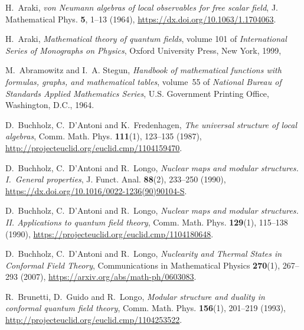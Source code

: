 \documentclass[a4paper,12pt]{article}
\theoremstyle{plain}
\theoremstyle{definition}
\theoremstyle{remark}
\begin{document}
{\small
\begin{thebibliography}{{Haa}96}

H.~Araki, \textsl{ von {N}eumann algebras of local observables for free scalar
  field},
\newblock J. Mathematical Phys. \textbf{ 5}, 1--13 (1964),
\newblock \url{https://dx.doi.org/10.1063/1.1704063}.

H.~Araki,
\newblock \textsl{ Mathematical theory of quantum fields}, volume 101 of
  \textsl{ International Series of Monographs on Physics},
\newblock Oxford University Press, New York, 1999,

M.~Abramowitz and I.~A. Stegun,
\newblock \textsl{ Handbook of mathematical functions with formulas, graphs,
  and mathematical tables}, volume~55 of \textsl{ National Bureau of Standards
  Applied Mathematics Series},
\newblock U.S. Government Printing Office, Washington, D.C., 1964.

D.~Buchholz, C.~D'Antoni and K.~Fredenhagen, \textsl{ The universal structure
  of local algebras},
\newblock Comm. Math. Phys. \textbf{ 111}(1), 123--135 (1987),
\newblock \url{http://projecteuclid.org/euclid.cmp/1104159470}.

D.~Buchholz, C.~D'Antoni and R.~Longo, \textsl{ Nuclear maps and modular
  structures. {I}.\ {G}eneral properties},
\newblock J. Funct. Anal. \textbf{ 88}(2), 233--250 (1990),
\newblock \url{https://dx.doi.org/10.1016/0022-1236(90)90104-S}.

D.~Buchholz, C.~D'Antoni and R.~Longo, \textsl{ Nuclear maps and modular
  structures. {II}. {A}pplications to quantum field theory},
\newblock Comm. Math. Phys. \textbf{ 129}(1), 115--138 (1990),
\newblock \url{https://projecteuclid.org/euclid.cmp/1104180648}.

D.~Buchholz, C.~D'Antoni and R.~Longo, \textsl{ Nuclearity and Thermal States
  in Conformal Field Theory},
\newblock Communications in Mathematical Physics \textbf{ 270}(1), 267--293
  (2007),
\newblock \url{https://arxiv.org/abs/math-ph/0603083}.

R.~Brunetti, D.~Guido and R.~Longo, \textsl{ Modular structure and duality in
  conformal quantum field theory},
\newblock Comm. Math. Phys. \textbf{ 156}(1), 201--219 (1993),
\newblock \url{http://projecteuclid.org/euclid.cmp/1104253522}.


\end{thebibliography}}
\end{document}
